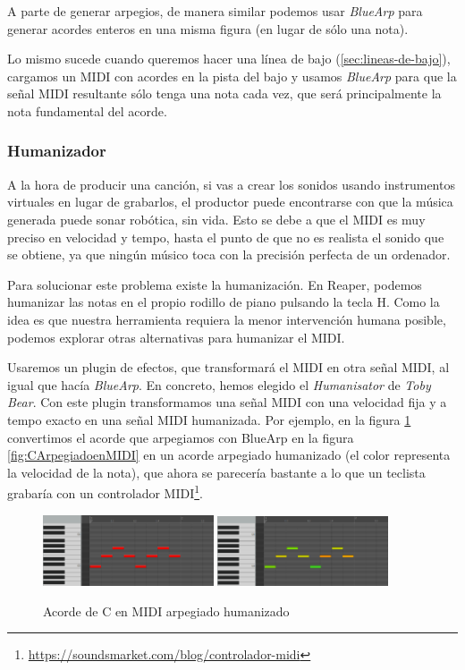 A parte de generar arpegios, de manera similar podemos usar \textit{BlueArp} para generar acordes enteros en una misma figura (en lugar de sólo una nota).

Lo mismo sucede cuando queremos hacer una línea de bajo (\ref{sec:lineas-de-bajo}), 
cargamos un MIDI con acordes en la pista del bajo y usamos \textit{BlueArp} para que la señal MIDI resultante sólo tenga una nota cada vez, que será principalmente la nota fundamental del acorde.
    
    \subsubsection{Humanizador}\label{subsubsec:humanizador}
A la hora de producir una canción, si vas a crear los sonidos usando instrumentos virtuales en lugar de grabarlos, el productor puede encontrarse con que la música generada puede sonar robótica, sin vida. Esto se debe a que el MIDI es muy preciso en velocidad y tempo, hasta el punto de que no es realista el sonido que se obtiene, ya que ningún músico toca con la precisión perfecta de un ordenador.

Para solucionar este problema existe la humanización. En Reaper, podemos humanizar las notas en el propio rodillo de piano pulsando la tecla H. Como la idea es que nuestra herramienta requiera la menor intervención humana posible, podemos explorar otras alternativas para humanizar el MIDI.

Usaremos un plugin de efectos, que transformará el MIDI en otra señal MIDI, al igual que hacía \textit{BlueArp}. En concreto, hemos elegido el \textit{Humanisator} de \textit{Toby Bear}. Con este plugin transformamos una señal MIDI con una velocidad fija y a tempo exacto en una señal MIDI humanizada. Por ejemplo, en la figura \ref{fig:CArpegiadoenMIDIHumanizado} convertimos el acorde que arpegiamos con BlueArp en la figura \ref{fig:CArpegiadoenMIDI} en un acorde arpegiado humanizado (el color representa la velocidad de la nota), que ahora se parecería bastante a lo que un teclista grabaría con un controlador MIDI\footnote{\url{https://soundsmarket.com/blog/controlador-midi}}.


\begin{figure}[h]
    \centering
    \includegraphics[width = 0.45\textwidth]{Imagenes/Bitmap/DoMayorMidiArpegiado.png}
    \includegraphics[width = 0.45\textwidth]{Imagenes/Bitmap/DoMayorMidiArpegiadoHumanizado.png}
    \caption{Acorde de C en MIDI arpegiado humanizado}
    \label{fig:CArpegiadoenMIDIHumanizado}
\end{figure}

